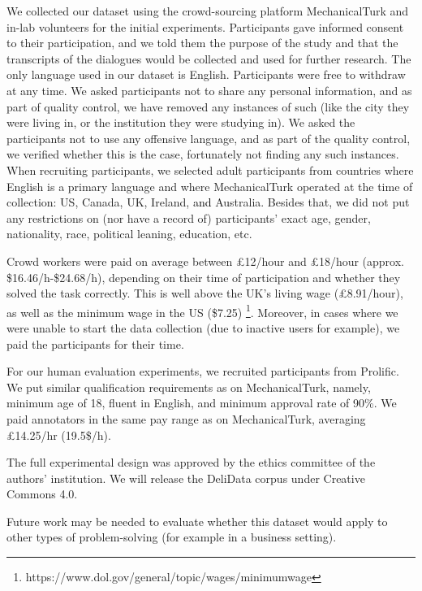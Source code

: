 \documentclass[acmsmall,manuscript,screen]{acmart}
\newcommand\newtext[1]{\textcolor{black}{#1}}
\begin{document}
We collected our dataset using the crowd-sourcing platform MechanicalTurk and in-lab volunteers for the initial experiments. Participants gave informed consent to their participation, and we told them the purpose of the study and that the transcripts of the dialogues would be collected and used for further research. The only language used in our dataset is English. Participants were free to withdraw at any time. We asked participants not to share any personal information, and as part of quality control, we have removed any instances of such (like the city they were living in, or the institution they were studying in). We asked the participants not to use any offensive language, and as part of the quality control, we verified whether this is the case, fortunately not finding any such instances. When recruiting participants, we selected adult participants from countries where English is a primary language and where MechanicalTurk operated at the time of collection: US, Canada, UK, Ireland, \newtext{and} Australia. Besides that, we did not put any restrictions on (nor have a record of) participants' exact age, gender, nationality, race, political leaning, education, etc. 


Crowd workers were paid on average between £12/hour and £18/hour (approx. \$16.46/h-\$24.68/h), depending on their time of participation and whether they solved the task correctly. This is well above the UK's living wage (£8.91/hour), as well as the minimum wage in the US (\$7.25) \footnote{https://www.dol.gov/general/topic/wages/minimumwage}.
Moreover, in cases where we were unable to start the data collection (due to inactive users for example), we paid the participants for their time. 


For our human evaluation experiments, we recruited participants from Prolific. We put similar qualification requirements as on MechanicalTurk, namely, minimum age of 18, fluent in English, and minimum approval rate of 90\%. We paid annotators in the same pay range as on MechanicalTurk, averaging £14.25/hr (19.5\$/h).

The full experimental design was approved by the ethics committee of the authors' institution. 
We will release the DeliData corpus under Creative Commons 4.0. 

\par

Future work may be needed to evaluate whether this dataset would apply to other types of problem-solving (for example in a business setting).
\end{document}
